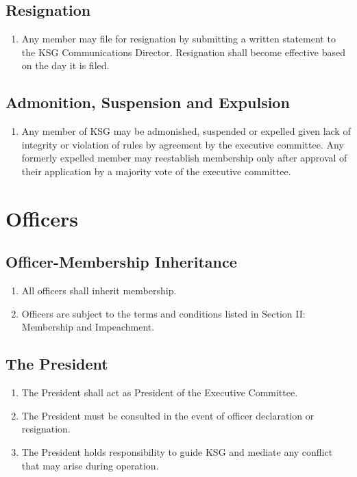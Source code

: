 \documentclass[12pt,executivepaper]{article}
\begin{document}
\subsection{Resignation}
\begin{enumerate}
    \item Any member may file for resignation by submitting a written statement to
          the KSG Communications Director. Resignation shall become effective based
          on the day it is filed.
\end{enumerate}

\subsection{Admonition, Suspension and Expulsion}
\begin{enumerate}
    \item Any member of KSG may be admonished, suspended or expelled given lack of
          integrity or violation of rules by agreement by the executive committee.
          Any formerly expelled member may reestablish membership only after approval
          of their application by a majority vote of the executive committee.
\end{enumerate}

\section{Officers}

\subsection{Officer-Membership Inheritance}
\begin{enumerate}
    \item All officers shall inherit membership.
    \item Officers are subject to the terms and conditions listed in Section II:
          Membership and Impeachment.
\end{enumerate}

\subsection{The President}
\begin{enumerate}
    \item The President shall act as President of the Executive Committee.
    \item The President must be consulted in the event of officer declaration or
          resignation.
    \item The President holds responsibility to guide KSG and mediate any conflict
          that may arise during operation.
\end{enumerate}
\end{document}
